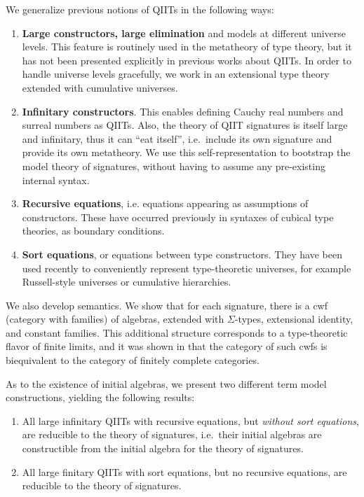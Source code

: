 \documentclass{llncs}
\begin{document}
We generalize previous notions of QIITs in the following ways:
\begin{enumerate}
  \item
  \textbf{Large constructors, large elimination} and models at different
  universe levels. This feature is routinely used in the metatheory of type
  theory, but it has not been presented explicitly in previous works about
  QIITs. In order to handle universe levels gracefully, we work in an
  extensional type theory extended with cumulative universes.
  \item
  \textbf{Infinitary constructors}. This enables defining Cauchy real numbers
  and surreal numbers as QIITs. Also, the theory of QIIT signatures is itself
  large and infinitary, thus it can ``eat itself'', i.e.\ include its own
  signature and provide its own metatheory.  We use this self-representation to
  bootstrap the model theory of signatures, without having to assume any
  pre-existing internal syntax.
  \item
  \textbf{Recursive equations}, i.e. equations appearing as assumptions
  of constructors. These have occurred previously in syntaxes of cubical type
  theories, as boundary conditions.
  \item
  \textbf{Sort equations}, or equations between type constructors. They have
  been used recently to conveniently represent type-theoretic universes, for
  example Russell-style universes or cumulative hierarchies.
\end{enumerate}

We also develop semantics. We show that for each signature, there is a cwf
(category with families) of algebras, extended with $\Sigma$-types, extensional
identity, and constant families. This additional structure corresponds to a
type-theoretic flavor of finite limits, and it was shown in \cite{TODO} that the
category of such cwfs is biequivalent to the category of finitely complete
categories.

As to the existence of initial algebras, we present two different term model
constructions, yielding the following results:

\begin{enumerate}
\item
  All large infinitary QIITs with recursive equations, but \emph{without
  sort equations}, are reducible to the theory of signatures, i.e.\
  their initial algebras are constructible from the initial algebra for
  the theory of signatures.
\item
  All large finitary QIITs with sort equations, but no recursive equations,
  are reducible to the theory of signatures.
\end{enumerate}
\end{document}
